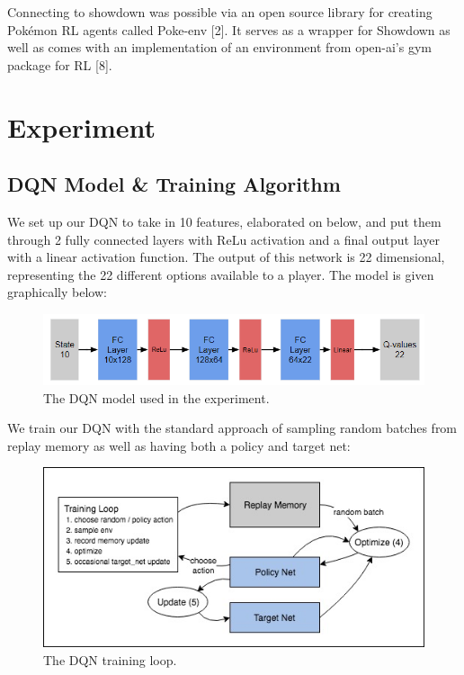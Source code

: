 \documentclass{article}
\begin{document}
Connecting to showdown was possible via an open source library for creating Pokémon RL agents called Poke-env [2]. It serves as a wrapper for Showdown as well as comes with an implementation of an environment from open-ai's gym package for RL [8].

\section{Experiment}
\subsection{DQN Model \& Training Algorithm}
We set up our DQN to take in 10 features, elaborated on below, and put them through 2 fully connected layers with ReLu activation and a final output layer with a linear activation function. The output of this network is 22 dimensional, representing the 22 different options available to a player. The model is given graphically below:

\begin{figure}[H]
  \centering
  \includegraphics[scale=.7]{dqn.png}
  \caption{The DQN model used in the experiment.}
\end{figure}

We train our DQN with the standard approach of sampling random batches from replay memory as well as having both a policy and target net:

\begin{figure}[H]
  \centering
  \includegraphics[scale=.7]{dqn-train.jpg}
  \caption{The DQN training loop.}
\end{figure}
\end{document}
